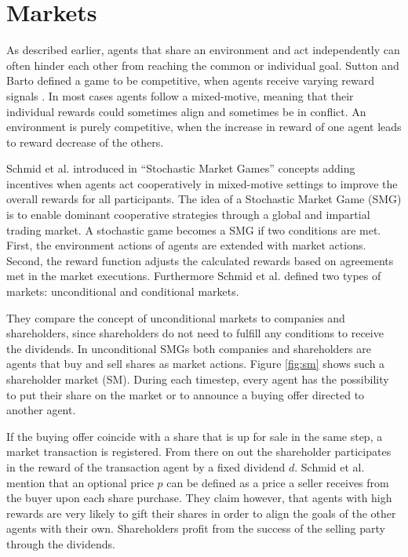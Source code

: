 \section{Markets}\label{market}
As described earlier, agents that share an environment and act independently can often hinder each other from reaching the common or individual goal. Sutton and Barto defined a game to be competitive, when agents receive varying reward signals \cite{suba18}. In most cases agents follow a mixed-motive, meaning that their individual rewards could sometimes align and sometimes be in conflict. An environment is purely competitive, when the increase in reward of one agent leads to reward decrease of the others.

Schmid et al. introduced in ``Stochastic Market Games'' \cite{scbe21} concepts adding incentives when agents act cooperatively in mixed-motive settings to improve the overall rewards for all participants. The idea of a Stochastic Market Game (SMG) is to enable dominant cooperative strategies through a global and impartial trading market. A stochastic game becomes a SMG if two conditions are met. First, the environment actions of agents are extended with market actions. Second, the reward function adjusts the calculated rewards based on agreements met in the market executions. Furthermore Schmid et al. defined two types of markets: unconditional and conditional markets.

They compare the concept of unconditional markets to companies and shareholders, since shareholders do not need to fulfill any conditions to receive the dividends. In unconditional SMGs both companies and shareholders are agents that buy and sell shares as market actions. Figure \ref{fig:sm} shows such a shareholder market (SM). During each timestep, every agent has the possibility to put their share on the market or to announce a buying offer directed to another agent.

If the buying offer coincide with a share that is up for sale in the same step, a market transaction is registered. From there on out the shareholder participates in the reward of the transaction agent by a fixed dividend $d$. Schmid et al. mention that an optional price $p$ can be defined as a price a seller receives from the buyer upon each share purchase. They claim however, that agents with high rewards are very likely to gift their shares in order to align the goals of the other agents with their own. Shareholders profit from the success of the selling party through the dividends.

